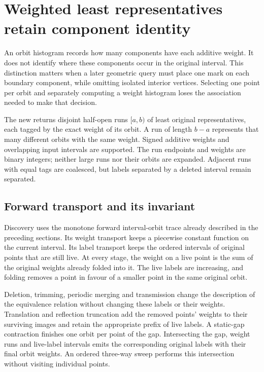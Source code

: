\section{Weighted least representatives retain component identity}
\label{sec:weighted-transversal}

An orbit histogram records how many components have each additive weight.
It does not identify where these components occur in the original interval.
This distinction matters when a later geometric query must place one mark on
each boundary component, while omitting isolated interior vertices. Selecting
one point per orbit and separately computing a weight histogram loses the
association needed to make that decision.

The new  returns disjoint half-open runs
$[a,b)$ of least original representatives, each tagged by the exact weight
of its orbit. A run of length $b-a$ represents that many different orbits
with the same weight. Signed additive weights and overlapping input intervals
are supported. The run endpoints and weights are binary integers; neither
large runs nor their orbits are expanded. Adjacent runs with equal tags are
coalesced, but labels separated by a deleted interval remain separated.

\subsection{Forward transport and its invariant}

Discovery uses the monotone forward interval-orbit trace already described
in the preceding sections. Its weight transport keeps a piecewise constant
function on the current interval. Its label transport keeps the ordered
intervals of original points that are still live. At every stage, the weight
on a live point is the sum of the original weights already folded into it.
The live labels are increasing, and folding removes a point in favour of a
smaller point in the same original orbit.

Deletion, trimming, periodic merging and transmission change the description
of the equivalence relation without changing these labels or their weights.
Translation and reflection truncation add the removed points' weights to
their surviving images and retain the appropriate prefix of live labels.
A static-gap contraction finishes one orbit per point of the gap. Intersecting
the gap, weight runs and live-label intervals emits the corresponding original
labels with their final orbit weights. An ordered three-way sweep performs
this intersection without visiting individual points.

